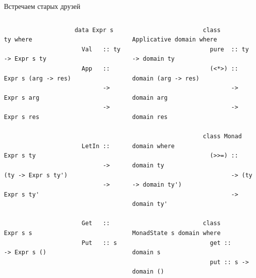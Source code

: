     \begin{frame}[fragile]{Встречаем старых друзей}
        \vspace{-1em}
        \begin{columns}[onlytextwidth]
            \begin{column}[t]{0.485\textwidth}
                \begin{verbatim}
                    data Expr s ty where
                      Val   :: ty -> Expr s ty
                      App   :: Expr s (arg -> res)
                            -> Expr s arg
                            -> Expr s res


                      LetIn :: Expr s ty
                            -> (ty -> Expr s ty')
                            -> Expr s ty'


                      Get   :: Expr s s
                      Put   :: s -> Expr s ()
                \end{verbatim}
            \end{column}\hfill%
            \begin{column}[t]{0.485\textwidth}
                \begin{verbatim}
                    class Applicative domain where
                      pure  :: ty -> domain ty
                      (<*>) :: domain (arg -> res)
                            -> domain arg
                            -> domain res

                    class Monad domain where
                      (>>=) :: domain ty
                            -> (ty -> domain ty')
                            -> domain ty'

                    class MonadState s domain where
                      get :: domain s
                      put :: s -> domain ()
                \end{verbatim}
            \end{column}
        \end{columns}
    \end{frame}

